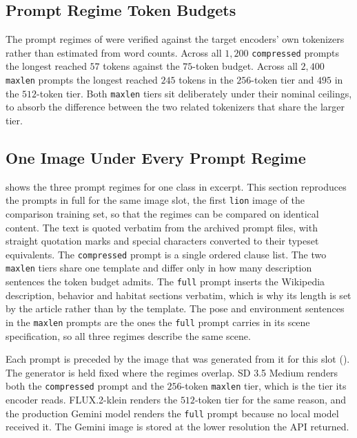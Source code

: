 \subsection{Prompt Regime Token Budgets}\label{sec:appendix_prompt_token_budgets}

The prompt regimes of  were verified against the target encoders' own tokenizers rather than estimated from word counts. Across all $1{,}200$ \texttt{compressed} prompts the longest reached $57$ tokens against the $75$-token budget. Across all $2{,}400$ \texttt{maxlen} prompts the longest reached $245$ tokens in the $256$-token tier and $495$ in the $512$-token tier. Both \texttt{maxlen} tiers sit deliberately under their nominal ceilings, to absorb the difference between the two related tokenizers that share the larger tier.

\subsection{One Image Under Every Prompt Regime}\label{sec:appendix_prompt_regime_examples}

 shows the three prompt regimes for one class in excerpt. This section reproduces the prompts in full for the same image slot, the first \texttt{lion} image of the comparison training set, so that the regimes can be compared on identical content. The text is quoted verbatim from the archived prompt files, with straight quotation marks and special characters converted to their typeset equivalents. The \texttt{compressed} prompt is a single ordered clause list. The two \texttt{maxlen} tiers share one template and differ only in how many description sentences the token budget admits. The \texttt{full} prompt inserts the Wikipedia description, behavior and habitat sections verbatim, which is why its length is set by the article rather than by the template. The pose and environment sentences in the \texttt{maxlen} prompts are the ones the \texttt{full} prompt carries in its scene specification, so all three regimes describe the same scene.

Each prompt is preceded by the image that was generated from it for this slot (). The generator is held fixed where the regimes overlap. SD 3.5 Medium renders both the \texttt{compressed} prompt and the $256$-token \texttt{maxlen} tier, which is the tier its encoder reads. FLUX.2-klein renders the $512$-token tier for the same reason, and the production Gemini model renders the \texttt{full} prompt because no local model received it. The Gemini image is stored at the lower resolution the API returned.

